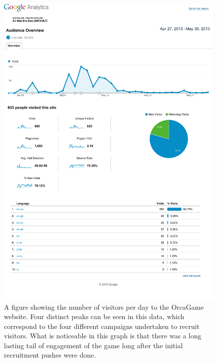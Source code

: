 \begin{figure}[h]
\centering
\includegraphics[width=\columnwidth]{figures/orcagameGA}
\caption{A figure showing the number of visitors per day to the
  OrcaGame website.  Four distinct peaks can be seen in this
  data, which correspond to the four different campaigns undertaken to
recruit visitors.  What is noticeable in this graph is that there was
a long lasting tail of engagement of the game long after the initial
recruitment pushes were done.  }
\label{fig:OrcaGameGA}
\end{figure}

